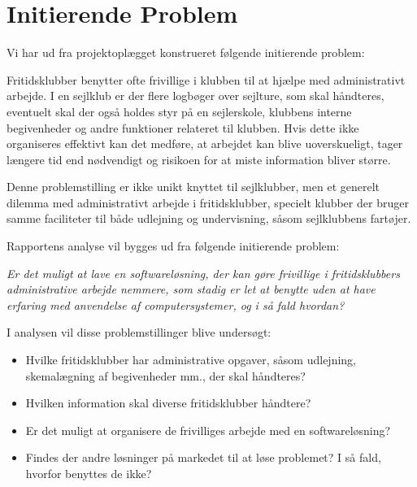 \section{Initierende Problem}
Vi har ud fra projektoplægget konstrueret følgende initierende problem:

Fritidsklubber benytter ofte frivillige i klubben til at hjælpe med administrativt arbejde.  I en sejlklub er der flere
logbøger over sejlture, som skal håndteres, eventuelt skal der også holdes styr på en sejlerskole, klubbens interne
begivenheder og andre funktioner relateret til klubben. Hvis dette ikke organiseres effektivt kan det medføre, at
arbejdet kan blive uoverskueligt, tager længere tid end nødvendigt og risikoen for at miste information bliver større.

Denne problemstilling er ikke unikt knyttet til sejlklubber, men et generelt dilemma med administrativt
arbejde i fritidsklubber, specielt klubber der bruger samme faciliteter til både udlejning og undervisning, såsom sejlklubbens fartøjer.

Rapportens analyse vil bygges ud fra følgende initierende problem:

\textit{Er det muligt at lave en softwareløsning, der kan gøre frivillige i fritidsklubbers administrative
arbejde nemmere, som stadig er let at benytte uden at have  erfaring med anvendelse af computersystemer, og i så fald hvordan?}

I analysen vil disse problemstillinger blive undersøgt:

\begin{itemize}
  \item Hvilke fritidsklubber har administrative opgaver, såsom udlejning, skemalægning af begivenheder mm., der
        skal håndteres?
  \item Hvilken information skal diverse fritidsklubber håndtere?
  \item Er det muligt at organisere de frivilliges arbejde med en softwareløsning?
  \item Findes der andre løsninger på markedet til at løse problemet? I så fald, hvorfor benyttes de ikke?
\end{itemize}